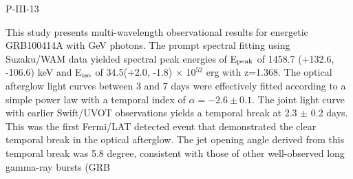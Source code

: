 P-III-13


\bigskip



\bigskip

\noindent This study presents multi-wavelength observational results for energetic
GRB100414A with GeV photons. The prompt spectral fitting using Suzaku/WAM data
yielded spectral peak energies of E$_{\rm peak}$ of 1458.7 (+132.6, -106.6) keV and
E$_{\rm iso}$ of 34.5(+2.0, -1.8) $\times$ 10$^{52}$ erg with z=1.368. The optical afterglow light
curves between 3 and 7 days were effectively fitted according to a simple power
law with a temporal index of $\alpha=-2.6 \pm 0.1$. The joint light curve with
earlier Swift/UVOT observations yields a temporal break at 2.3 $\pm$ 0.2 days.
This was the first Fermi/LAT detected event that demonstrated the clear
temporal break in the optical afterglow. The jet opening angle derived from
this temporal break was 5.8 degree, consistent with those of other
well-observed long gamma-ray bursts (GRB


